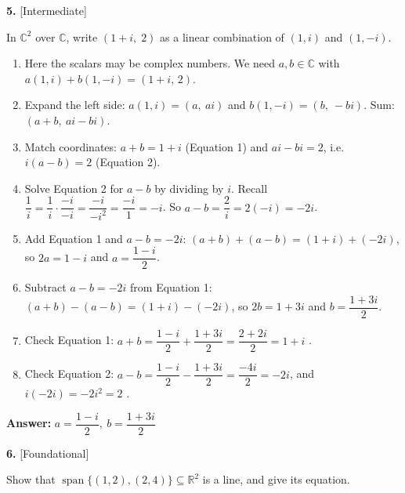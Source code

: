 \documentclass[11pt]{article}
\begin{document}
\par\vspace{2pt}
\begin{minipage}{\linewidth}\textbf{5.} \hfill{\scriptsize\color{ink}[Intermediate]}\par\nopagebreak In $\mathbb{C}^{2}$ over $\mathbb{C}$, write $(1+i,\;2)$ as a linear combination of $(1,i)$ and $(1,-i)$.
\end{minipage}\par\nopagebreak
\begin{tcolorbox}[breakable,colback=ans,colframe=ansb,boxrule=0.5pt,left=4pt,right=4pt,top=2pt,bottom=2pt]\begin{enumerate}[leftmargin=2.2em,itemsep=1pt,topsep=1pt,label=\textbf{Step \arabic*.}]\item Here the scalars may be complex numbers. We need $a,b\in\mathbb{C}$ with $a(1,i)+b(1,-i)=(1+i,\,2)$.
\item Expand the left side: $a(1,i)=(a,\ ai)$ and $b(1,-i)=(b,\ -bi)$. Sum: $(a+b,\ ai-bi)$.
\item Match coordinates: $a+b=1+i$ \quad (Equation 1) and \quad $ai-bi=2$, i.e.\ $i(a-b)=2$ \quad (Equation 2).
\item Solve Equation 2 for $a-b$ by dividing by $i$. Recall $\dfrac1i=\dfrac{1}{i}\cdot\dfrac{-i}{-i}=\dfrac{-i}{-i^{2}}=\dfrac{-i}{1}=-i$. So $a-b=\dfrac2i=2(-i)=-2i$.
\item Add Equation 1 and $a-b=-2i$: $(a+b)+(a-b)=(1+i)+(-2i)$, so $2a=1-i$ and $a=\dfrac{1-i}{2}$.
\item Subtract $a-b=-2i$ from Equation 1: $(a+b)-(a-b)=(1+i)-(-2i)$, so $2b=1+3i$ and $b=\dfrac{1+3i}{2}$.
\item Check Equation 1: $a+b=\dfrac{1-i}{2}+\dfrac{1+3i}{2}=\dfrac{2+2i}{2}=1+i$ \checkmark.
\item Check Equation 2: $a-b=\dfrac{1-i}{2}-\dfrac{1+3i}{2}=\dfrac{-4i}{2}=-2i$, and $i(-2i)=-2i^{2}=2$ \checkmark.
\end{enumerate}\textbf{Answer:} $a=\dfrac{1-i}{2},\ b=\dfrac{1+3i}{2}$\end{tcolorbox}
\par\vspace{2pt}
\begin{minipage}{\linewidth}\textbf{6.} \hfill{\scriptsize\color{ink}[Foundational]}\par\nopagebreak Show that $\operatorname{span}\{(1,2),(2,4)\}\subseteq\mathbb{R}^{2}$ is a line, and give its equation.
\end{minipage}\par\nopagebreak
\end{document}
